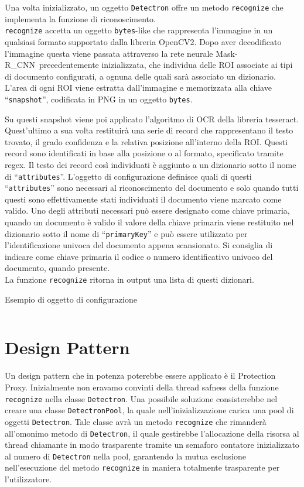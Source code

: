 \documentclass[12pt,a4paper]{article}
\newcommand{\mrcnn}{Mask-R\_CNN}
\begin{document}
Una volta inizializzato, un oggetto \texttt{Detectron} offre un metodo
\texttt{recognize} che implementa la funzione di riconoscimento.\\
\texttt{recognize} accetta un oggetto \texttt{bytes}-like che
rappresenta l'immagine in un qualsiasi formato supportato dalla libreria
OpenCV2. Dopo aver decodificato l'immagine questa viene passata
attraverso la rete neurale \mrcnn\ precedentemente inizializzata, che
individua delle ROI associate ai tipi di documento configurati, a ognuna
delle quali sarà associato un dizionario. L'area di ogni ROI viene
estratta dall'immagine e memorizzata alla chiave ``\texttt{snapshot}'',
codificata in PNG in un oggetto \texttt{bytes}.

Su questi snapshot viene poi applicato l'algoritmo di OCR della libreria
tesseract. Quest'ultimo a sua volta restituirà una serie di record che
rappresentano il testo trovato, il grado confidenza e la relativa
posizione all'interno della ROI. Questi record sono identificati in base
alla posizione o al formato, specificato tramite regex. Il testo dei
record così individuati è aggiunto a un dizionario sotto il nome di
``\texttt{attributes}''. L'oggetto di configurazione definisce quali di
questi ``\texttt{attributes}'' sono necessari al riconoscimento del
documento e solo quando tutti questi sono effettivamente stati
individuati il documento viene marcato come valido. Uno degli attributi
necessari può essere designato come chiave primaria, quando un documento
è valido il valore della chiave primaria viene restituito nel dizionario
sotto il nome di ``\texttt{primaryKey}'' e può essere utilizzato per
l'identificazione univoca del documento appena scansionato. Si consiglia
di indicare come chiave primaria il codice o numero identificativo
univoco del documento, quando presente.\\
La funzione \texttt{recognize} ritorna in output una lista di questi
dizionari.

\begin{listing}[H]
    \caption{Esempio di oggetto di configurazione}
    \inputminted{python}{config.py}
\end{listing}

\section{Design Pattern}

Un design pattern che in potenza poterebbe essere applicato è il
Protection Proxy. Inizialmente non eravamo convinti della thread safness
della funzione \texttt{recognize} nella classe \texttt{Detectron}. Una
possibile soluzione consisterebbe nel creare una classe
\texttt{DetectronPool}, la quale nell'inizializzazione carica una pool
di oggetti \texttt{Detectron}. Tale classe avrà un metodo
\texttt{recognize} che rimanderà all'omonimo metodo di
\texttt{Detectron}, il quale gestirebbe l'allocazione della risorsa al
thread chiamante in modo trasparente tramite un semaforo contatore
inizializzato al numero di \texttt{Detectron} nella pool, garantendo la
mutua esclusione nell'esecuzione del metodo \texttt{recognize} in
maniera totalmente trasparente per l'utilizzatore.
\end{document}
